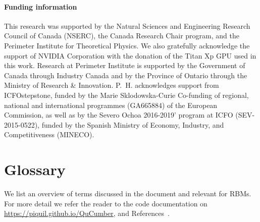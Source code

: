 \documentclass[submission, Phys, hidelnks]{SciPost}
\begin{document}
\paragraph{Funding information}

This research was supported by the Natural Sciences and Engineering
Research Council of Canada (NSERC), the
Canada Research Chair program, and the Perimeter Institute
for Theoretical Physics. We also gratefully
acknowledge the support of NVIDIA Corporation with
the donation of the Titan Xp GPU used in this work.
Research at Perimeter Institute is supported by the Government
of Canada through Industry Canada and by the
Province of Ontario through the Ministry of Research \&
Innovation. P.~H. acknowledges support from ICFOstepstone, funded by the Marie Sklodowska-Curie Co-funding of regional, national and international programmes (GA665884) of the European Commission, as well as by the Severo Ochoa 2016-2019' program at ICFO (SEV-2015-0522), funded by the Spanish Ministry of Economy, Industry, and Competitiveness (MINECO).


\appendix
\section{Glossary}
\label{Glossary}

We list an overview of terms discussed in the document and relevant for RBMs. For more detail we refer the reader to the code documentation on \url{https://piquil.github.io/QuCumber}, and References~\cite{hinton2002training, hinton2012practical}.
\end{document}
